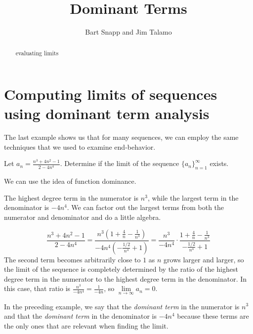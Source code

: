 \documentclass{ximera}
\author{Bart Snapp and Jim Talamo}
\title{Dominant Terms}
\begin{document}
\begin{abstract}
evaluating limits
\end{abstract}
\maketitle






\section{Computing limits of sequences using dominant term analysis}
The last example shows us that for many sequences, we can employ the same techniques that we used to examine end-behavior.  

\begin{example}
Let $a_n = \frac{n^3+4n^2-1}{2-4n^4}$.  Determine if the limit of the sequence $\{a_n\}_{n=1}^{\infty}$ exists.

\begin{explanation}
We can use the idea of function dominance. 

The highest degree term in the numerator is $n^3$, while the largest term in the denominator is $-4n^4$.  We can factor out the largest terms from both the numerator and denominator and do a little algebra.

\[
\frac{n^3+4n^2-1}{2-4n^4} = \frac{n^3\left(1+\frac{4}{n}-\frac{1}{n^3}\right)}{-4n^4\left(-\frac{1/2}{n^4}+1\right)} = \frac{n^3}{-4n^4} \cdot  \frac{1+\frac{4}{n}-\frac{1}{n^3}}{-\frac{1/2}{n^4}+1}
\]
The second term becomes arbitrarily close to $1$ as $n$ grows larger and larger, so the limit of the sequence is completely determined by the ratio of the highest degree term in the numerator to the highest degree term in the denominator.  In this case, that ratio is $\frac{n^3}{-4n^4} = \frac{1}{-4n}$, so $\lim\limits_{n \to \infty} a_n = 0$.

\end{explanation}
\end{example}










In the preceding example, we say that the \emph{dominant term} in the numerator is $n^3$ and that the \emph{dominant term} in the denominator is $-4n^4$ because these terms are the only ones that are relevant when finding the limit.
\end{document}
